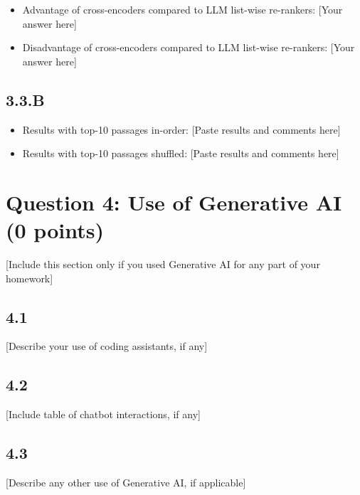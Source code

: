 \documentclass{article}
\begin{document}
\begin{itemize}
    \item Advantage of cross-encoders compared to LLM list-wise re-rankers: [Your answer here]
    \item Disadvantage of cross-encoders compared to LLM list-wise re-rankers: [Your answer here]
\end{itemize}

\subsection*{3.3.B}

\begin{itemize}
    \item Results with top-10 passages in-order:
    [Paste results and comments here]
    \item  Results with top-10 passages shuffled:
    [Paste results and comments here]
\end{itemize}

\section*{Question 4: Use of Generative AI (0 points)}

[Include this section only if you used Generative AI for any part of your homework]

\subsection*{4.1}

[Describe your use of coding assistants, if any]

\subsection*{4.2}

[Include table of chatbot interactions, if any]

\subsection*{4.3}

[Describe any other use of Generative AI, if applicable]
\end{document}
